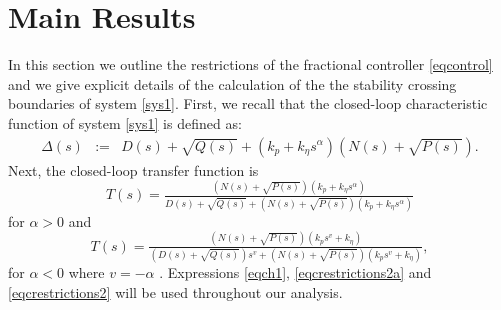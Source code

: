 \documentclass[twoside,reqno,11pt]{fcaa-var} %
\begin{document}
\section{Main Results}\label{sec:main}
In this section we outline the restrictions of the fractional controller \eqref{eqcontrol} and we give explicit details of the calculation of the the stability crossing boundaries of system \eqref{sys1}. First, we recall that the closed-loop characteristic function of system \eqref{sys1} is defined as:
\begin{eqnarray}
\Delta(s)\!\!\!\!\!\!\!\!&:=&\!\!\!\!\!\!\!\!D(s)+\sqrt{Q(s)}+(k_p+k_\eta s^\alpha)(N(s)+\sqrt{P(s)}). \label{eqch1}
\end{eqnarray}
Next, the closed-loop transfer function is
\begin{equation}
T(s)=\tfrac{(N(s)+\sqrt{P(s)})(k_p+k_\eta s^\alpha)}{D(s)+\sqrt{Q(s)}+(N(s)+\sqrt{P(s)})(k_p+k_\eta s^\alpha)}\label{eqcrestrictions2a}
\end{equation}
for $\alpha>0$ and
\begin{equation}
T(s)=\tfrac{(N(s)+\sqrt{P(s)})(k_ps^v+k_\eta)}{(D(s)+\sqrt{Q(s)})s^v+(N(s)+\sqrt{P(s)})(k_ps^v+k_\eta)}, \label{eqcrestrictions2}
\end{equation}
for $\alpha<0$ where $v=-\alpha$ . Expressions \eqref{eqch1}, \eqref{eqcrestrictions2a} and \eqref{eqcrestrictions2} will be used throughout our analysis.%
\end{document}
